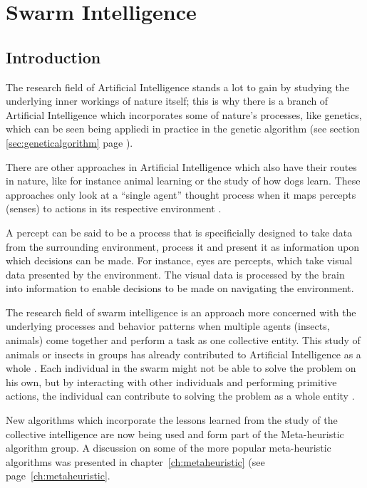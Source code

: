 \chapter{Swarm Intelligence}
\section{Introduction}
The research field of Artificial Intelligence stands a lot to gain by studying the underlying inner workings of nature itself; this is why there is a branch of Artificial Intelligence which incorporates some of nature’s processes, like genetics, which can be seen being appliedi in practice in the genetic algorithm (see section \ref{sec:geneticalgorithm} page \pageref{sec:geneticalgorithm}).

 There are other approaches in Artificial Intelligence which also have their routes in nature, like for instance animal learning or the study of how dogs learn. These approaches only look at a “single agent” thought process when it maps percepts (senses) to actions in its respective environment \cite{DLearning}. 
 
 A percept can be said to be a process that is specificially designed to take data from the surrounding environment, process it and present it as information upon which decisions can be made\cite{DLearning,AIModernApproach}. For instance, eyes are percepts, which take visual data presented by the environment. The visual data is processed by the brain into information to enable decisions to be made on navigating the environment.

The research field of swarm intelligence is an approach more concerned with the underlying processes and behavior patterns when multiple agents (insects, animals) come together and perform a task as one collective entity.  This study of animals or insects in groups has already contributed to Artificial Intelligence as a whole \cite{ChaoticSwarmIntel,BeeJobShop}. Each individual in the swarm might not be able to solve the problem on his own, but by interacting with other individuals and performing primitive actions, the individual can contribute to solving the problem as a whole entity \cite{BeeJobShop}. 

New algorithms which incorporate the lessons learned from the study of the collective intelligence are now being used and form part of the Meta-heuristic algorithm group. A discussion on some of the more popular meta-heuristic algorithms was presented in chapter~\ref{ch:metaheuristic} (see page~\ref{ch:metaheuristic}. 


